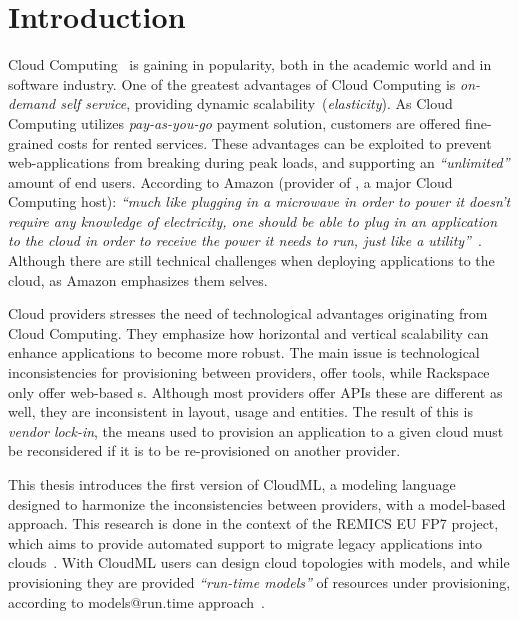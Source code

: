 \chapter{Introduction}

Cloud Computing~\cite{Armbrust:EECS-2009-28} is gaining in popularity,
both in the academic world and in software industry.
One of the greatest advantages of Cloud Computing is \emph{on-demand self service},
providing dynamic scalability~(\emph{elasticity}).
As Cloud Computing utilizes \emph{pay-as-you-go} payment solution,
customers are offered fine-grained costs for rented services.
These advantages can be exploited to prevent web-applications
from breaking during peak loads, and supporting an \emph{``unlimited''}
amount of end users.
According to Amazon (provider of , a major Cloud Computing host):
\emph{``much like plugging in a microwave in order to power it doesn't require any knowledge of electricity,
one should be able to plug in an application to the cloud in order
to receive the power it needs to run, 
just like a utility''}~\cite{aws:varia10}.
Although there are still technical challenges when deploying applications to the cloud,
as Amazon emphasizes them selves.

Cloud providers stresses the need of technological advantages originating from Cloud Computing.
They emphasize how horizontal and vertical scalability can enhance applications
to become more robust.
The main issue is technological inconsistencies for provisioning between providers,
\eg {} offer  tools, while Rackspace only offer web-based s.
Although most providers offer APIs these are different as well, 
they are inconsistent in layout, usage and entities.
The result of this is \emph{vendor lock-in}, the means used to provision an application to
a given cloud must be reconsidered if it is to be re-provisioned on another provider.

This thesis introduces the first version of CloudML,
a modeling language designed to harmonize the inconsistencies between providers,
with a model-based approach.
This research is done in the context of the REMICS EU FP7 project,
which aims to provide automated support to migrate legacy applications into
clouds~\cite{DBLP:conf/services/MohagheghiS11}.
With CloudML users can design cloud topologies with models,
and while provisioning they are provided \emph{``run-time models''} of 
resources under provisioning,
according to models@run.time approach~\cite{DBLP:journals/dagstuhl-reports/AssmannBCF11}.

